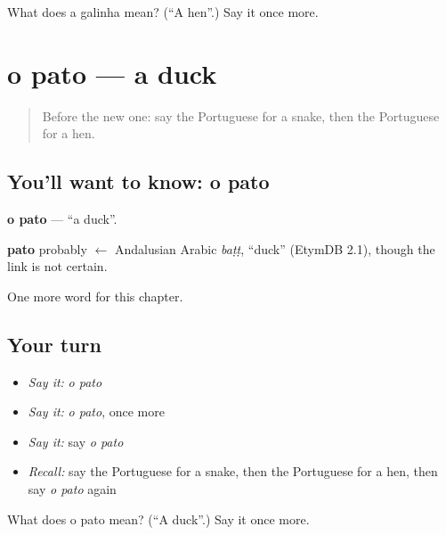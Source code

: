 \begin{tcolorbox}[breakable,colback=teal!4,colframe=teal!35!black,title={Before you move on}]
What does a galinha mean? (\textquotedblleft{}A hen\textquotedblright{}.) Say it once more.
\end{tcolorbox}
\section[o pato]{o pato — a duck}

\label{lesson:PT-C62-pato}



\begin{quote}
Before the new one: say the Portuguese for a snake, then the Portuguese for a hen.
\end{quote}

\subsection*{You'll want to know: o pato}
\textbf{o pato} — \textquotedblleft{}a duck\textquotedblright{}.

\begin{cousinweb}
\textbf{pato} probably $\leftarrow$ Andalusian Arabic \emph{baṭṭ}, \textquotedblleft{}duck\textquotedblright{} (EtymDB 2.1), though the link is not certain.
\end{cousinweb}

\begin{grammarlens}[title={What you've built}]
One more word for this chapter.
\end{grammarlens}

\subsection*{Your turn}
\begin{itemize}
\raggedright
  \item \emph{Say it:} \emph{o pato}
  \item \emph{Say it:} \emph{o pato}, once more
  \item \emph{Say it:} say \emph{o pato}
  \item \emph{Recall:} say the Portuguese for a snake, then the Portuguese for a hen, then say \emph{o pato} again
\end{itemize}

\begin{tcolorbox}[breakable,colback=teal!4,colframe=teal!35!black,title={Before you move on}]
What does o pato mean? (\textquotedblleft{}A duck\textquotedblright{}.) Say it once more.
\end{tcolorbox}
